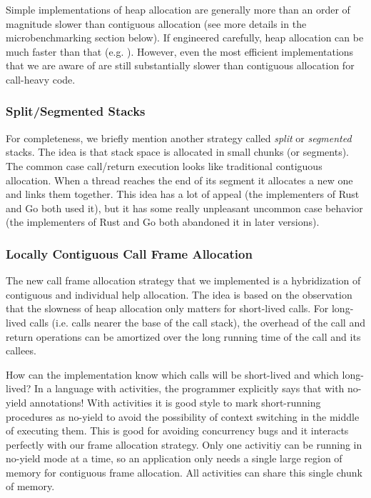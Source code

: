 \documentclass[10pt,preprint]{sigplanconf}
\begin{document}
Simple implementations of heap allocation are generally more than an order of magnitude slower than contiguous allocation (see more details in the microbenchmarking section below).
If engineered carefully, heap allocation can be much faster than that (e.g. \cite{Shao2000}).
However, even the most efficient implementations that we are aware of are still substantially slower than contiguous allocation for call-heavy code.

\subsubsection{Split/Segmented Stacks}

For completeness, we briefly mention another strategy called \emph{split} or \emph{segmented} stacks.
The idea is that stack space is allocated in small chunks (or segments).
The common case call/return execution looks like traditional contiguous allocation.
When a thread reaches the end of its segment it allocates a new one and links them together.
This idea has a lot of appeal (the implementers of Rust and Go both used it), but it has some really unpleasant uncommon case behavior (the implementers of Rust and Go both
abandoned it in later versions).

\subsubsection{Locally Contiguous Call Frame Allocation}

The new call frame allocation strategy that we implemented is a hybridization of contiguous and individual help allocation.
The idea is based on the observation that the slowness of heap allocation only matters for short-lived calls.
For long-lived calls (i.e. calls nearer the base of the call stack), the overhead of the call and return operations can be amortized over the long running time of the call and its callees.

How can the implementation know which calls will be short-lived and which long-lived?
In a language with activities, the programmer explicitly says that with no-yield annotations!
With activities it is good style to mark short-running procedures as no-yield to avoid the possibility of context switching in the middle of executing them.
This is good for avoiding concurrency bugs and it interacts perfectly with our frame allocation strategy.
Only one activitiy can be running in no-yield mode at a time, so an application only needs a single large region of memory for contiguous frame allocation.
All activities can share this single chunk of memory.
\end{document}
